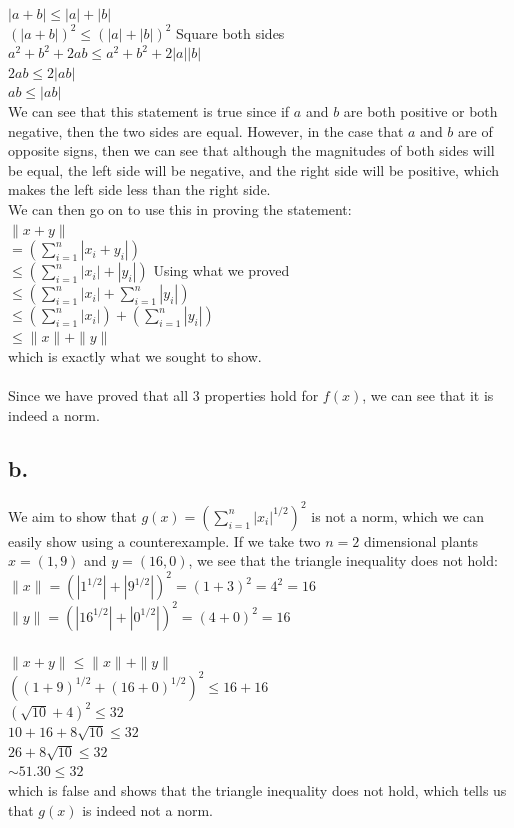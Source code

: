 \documentclass{article}
\newcommand{\1}{\mathbf{1}}
\begin{document}
{$|a + b| \leq |a| + |b|$ \\
$(|a + b|)^2 \leq (|a| + |b|)^2$ \hfill Square both sides \\
$a^2 + b^2 + 2ab \leq a^2 + b^2 + 2|a||b|$ \\
$2ab \leq 2|ab|$ \\
$ab \leq |ab|$ \\ 
We can see that this statement is true since if $a$ and $b$ are both positive or both negative, then the two sides are equal. However, in the case that $a$ and $b$ are of opposite signs, then we can see that although the magnitudes of both sides will be equal, the left side will be negative, and the right side will be positive, which makes the left side less than the right side. \\
We can then go on to use this in proving the statement: \\
$\|x + y\| $ \\ 
$= (\sum_{i=1}^{n} |x_i + y_i|) $ \\
$\leq (\sum_{i=1}^{n} |x_i| + |y_i|) $ \hfill Using what we proved \\
$\leq (\sum_{i=1}^{n} |x_i| + \sum_{i=1}^{n} |y_i|) $ \\
$\leq (\sum_{i=1}^{n} |x_i|) + (\sum_{i=1}^{n} |y_i|) $ \\
$\leq \|x\| + \|y\|$ \\
which is exactly what we sought to show. \\ \\
Since we have proved that all 3 properties hold for $f(x)$, we can see that it is indeed a norm. 

\subsection*{b.}

We aim to show that $g(x) = \left(\sum_{i=1}^n |x_i|^{1/2}\right)^2$ is not a norm, which we can easily show using a counterexample. If we take two $n=2$ dimensional plants $x = (1, 9)$ and $y = (16, 0)$, we see that the triangle inequality does not hold: \\
$\| x \| = (|1^{1/2}| + |9^{1/2}|)^2 = (1 + 3)^2 = 4^2 = 16$ \\ 
$\| y \| = (|16^{1/2}| + |0^{1/2}|)^2 = (4 + 0)^2 = 16$ \\ \\
$\|x + y\| \leq \|x\| + \|y\|$ \\ 
$((1 + 9)^{1/2} + (16 + 0)^{1/2})^2 \leq 16 + 16$ \\ 
$(\sqrt{10} + 4)^2 \leq 32$ \\ 
$10 + 16 + 8\sqrt{10} \leq 32$ \\ 
$26 + 8\sqrt{10} \leq 32$ \\ 
$\sim 51.30 \leq 32$ \\ 
which is false and shows that the triangle inequality does not hold, which tells us that $g(x)$ is indeed not a norm.

}
\end{document}
